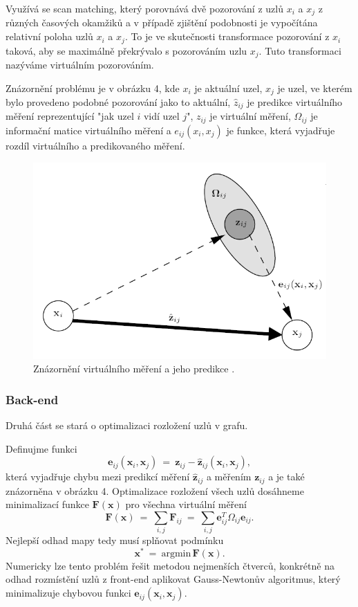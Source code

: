 \documentclass[12pt,a4paper]{article}
\begin{document}
Využívá se scan matching, který porovnává dvě pozorování z uzlů $x_i$ a $x_j$ z různých časových okamžiků a v případě zjištění podobnosti je vypočítána relativní poloha uzlů $x_i$ a $x_j$. To je ve skutečnosti transformace pozorování z $x_i$ taková, aby se maximálně překrývalo s pozorováním uzlu $x_j$. Tuto transformaci nazýváme virtuálním pozorováním.

Znázornění problému je v obrázku 4, kde $x_i$ je aktuální uzel, $x_j$ je uzel, ve kterém bylo provedeno podobné pozorování jako to aktuální, $\hat{z}_{ij}$ je predikce virtuálního měření reprezentující "jak uzel $i$ vidí uzel $j$", $z_{ij}$ je virtuální měření, $\Omega_{ij}$ je informační matice virtuálního měření a $e_{ij}(x_i, x_j)$ je funkce, která vyjadřuje rozdíl virtuálního a predikovaného měření.
\begin{figure}[H]
\centering
\includegraphics[scale=0.8]{img/Obr4_b}
\caption{Znázornění virtuálního měření a jeho predikce \cite{tutorialGraph}.}
\end{figure}



\subsubsection{Back-end}
Druhá část se stará o optimalizaci rozložení uzlů v grafu.

Definujme funkci 
$$
\textbf{e}_{ij}(\textbf{x}_i, \textbf{x}_j) \: = \: \textbf{z}_{ij}-\hat{\textbf{z}}_{ij}(\textbf{x}_i, \textbf{x}_j),
$$
která vyjadřuje chybu mezi predikcí měření $\hat{\textbf{z}}_{ij}$ a měřením $\textbf{z}_{ij}$ a je také znázorněna v obrázku 4. Optimalizace rozložení všech uzlů dosáhneme minimalizací funkce $\textbf{F}(\textbf{x})$ pro všechna virtuální měření
$$
\textbf{F}(\textbf{x}) \: = \: \sum\limits_{i,j} \textbf{F}_{ij} \: = \: \sum\limits_{i,j} \textbf{e}_{ij}^T \Omega_{ij} \textbf{e}_{ij}.
$$
Nejlepší odhad mapy tedy musí splňovat podmínku
$$
\textbf{x}^* \: = \: \text{argmin}\, \textbf{F}(\textbf{x}).
$$
Numericky lze tento problém řešit metodou nejmenších čtverců, konkrétně na odhad rozmístění uzlů z front-end aplikovat Gauss-Newtonův algoritmus, který minimalizuje chybovou funkci $\textbf{e}_{ij}(\textbf{x}_i, \textbf{x}_j)$.
\end{document}
